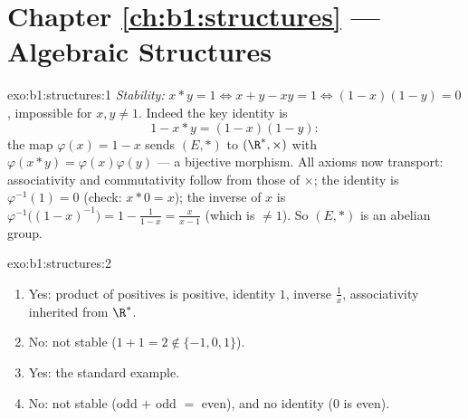 \section*{Chapter \ref{ch:b1:structures} --- Algebraic Structures}

\begin{solution}{exo:b1:structures:1}
\emph{Stability:} $x * y = 1 \iff x + y - xy = 1 \iff (1-x)(1-y) = 0$,
impossible for $x, y \neq 1$. Indeed the key identity is
\[
1 - x * y = (1 - x)(1 - y):
\]
the map $\varphi(x) = 1 - x$ sends $(E, *)$ to $(\R^*, \times)$ with
$\varphi(x * y) = \varphi(x)\varphi(y)$ --- a bijective morphism. All
axioms now transport: associativity and commutativity follow from
those of $\times$; the identity is $\varphi^{-1}(1) = 0$ (check: $x *
0 = x$); the inverse of $x$ is $\varphi^{-1}\bigl((1-x)^{-1}\bigr) =
1 - \frac{1}{1-x} = \frac{x}{x - 1}$ (which is $\neq 1$). So $(E, *)$
is an abelian group.
\end{solution}

\begin{solution}{exo:b1:structures:2}
\begin{enumerate}
  \item Yes: product of positives is positive, identity $1$, inverse
        $\frac 1x$, associativity inherited from $\R^*$.
  \item No: not stable ($1 + 1 = 2 \notin \{-1,0,1\}$).
  \item Yes: the standard example.
  \item No: not stable (odd $+$ odd $=$ even), and no identity ($0$ is
        even).
\end{enumerate}
\end{solution}

